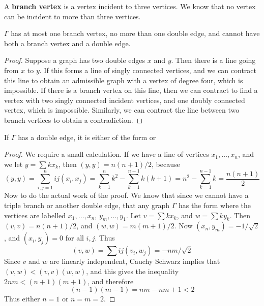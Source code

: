 A {\bf branch vertex} is a vertex incident to three vertices. We know that no vertex can be incident to more than three vertices.

\begin{lemma}
    $\Gamma$ has at most one branch vertex, no more than one double edge, and cannot have both a branch vertex and a double edge.
\end{lemma}
\begin{proof}
    Suppose a graph has two double edges $x$ and $y$. Then there is a line going from $x$ to $y$. If this forms a line of singly connected vertices, and we can contract this line to obtain an admissible graph with a vertex of degree four, which is impossible. If there is a branch vertex on this line, then we can contract to find a vertex with two singly connected incident vertices, and one doubly connected vertex, which is impossible. Similarly, we can contract the line between two branch vertices to obtain a contradiction.
\end{proof}

\begin{lemma}
    If $\Gamma$ has a double edge, it is either of the form
    or
\end{lemma}
\begin{proof}
    We require a small calculation. If we have a line of vertices $x_1, \dots, x_n$, and we let $y = \sum k x_k$, then $(y,y) = n(n+1)/2$, because
%
\[ (y,y) = \sum_{i,j = 1}^n ij (x_i, x_j) = \sum_{k = 1}^n k^2 - \sum_{k = 1}^{n-1} k(k+1) = n^2 - \sum_{k = 1}^{n-1} k = \frac{n(n+1)}{2} \]
%
    Now to do the actual work of the proof. We know that since we cannot have a triple branch or another double edge, that any graph $\Gamma$ has the form
    where the vertices are labelled $x_1, \dots, x_n$, $y_m, \dots, y_1$. Let $v = \sum k x_k$, and $w = \sum k y_k$. Then $(v,v) = n(n+1)/2$, and $(w,w) = m(m+1)/2$. Now $(x_n, y_m) = -1/\sqrt{2}$, and $(x_i, y_j) = 0$ for all $i,j$. Thus
    \[ (v,w) = \sum ij (v_i, w_j) = -nm/\sqrt{2} \]
    Since $v$ and $w$ are linearly independent, Cauchy Schwarz implies that $(v,w) < (v,v)(w,w)$, and this gives the inequality $2nm < (n+1)(m+1)$, and therefore
    \[ (n-1)(m-1) = nm - n m  + 1 < 2 \]
    Thus either $n = 1$ or $n = m = 2$.
\end{proof}

